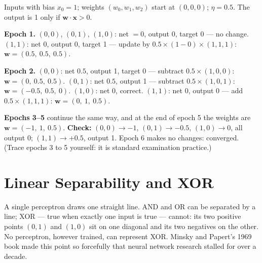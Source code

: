 \begin{worked}
Inputs with bias $x_0 = 1$; weights $(w_0, w_1, w_2)$ start at $(0, 0, 0)$; $\eta = 0.5$.
The output is 1 only if $\mathbf{w}\cdot\mathbf{x} > 0$.

\smallskip
\textbf{Epoch 1.} $(0,0)$, $(0,1)$, $(1,0)$: net $= 0$, output 0, target 0 --- no change.
$(1,1)$: net $0$, output 0, target 1 --- update by $0.5 \times (1 - 0) \times (1, 1, 1)$:
$\mathbf{w} = (0.5,\ 0.5,\ 0.5)$.

\textbf{Epoch 2.} $(0,0)$: net $0.5$, output 1, target 0 --- subtract $0.5 \times (1,0,0)$:
$\mathbf{w} = (0,\ 0.5,\ 0.5)$. $(0,1)$: net $0.5$, output 1 --- subtract
$0.5 \times (1,0,1)$: $\mathbf{w} = (-0.5,\ 0.5,\ 0)$. $(1,0)$: net $0$, correct.
$(1,1)$: net $0$, output 0 --- add $0.5 \times (1,1,1)$: $\mathbf{w} = (0,\ 1,\ 0.5)$.

\textbf{Epochs 3--5} continue the same way, and at the end of epoch 5 the weights are
$\mathbf{w} = (-1,\ 1,\ 0.5)$. \textbf{Check:} $(0,0) \to -1$, $(0,1) \to -0.5$,
$(1,0) \to 0$, all output 0; $(1,1) \to +0.5$, output 1. Epoch 6 makes no changes:
converged. (Trace epochs 3 to 5 yourself: it is standard examination practice.)
\end{worked}

\section{Linear Separability and XOR}

A single perceptron draws one straight line. AND and OR can be separated by a line;
XOR --- true when exactly one input is true --- cannot: its two positive points
$(0,1)$ and $(1,0)$ sit on one diagonal and its two negatives on the other. No
perceptron, however trained, can represent XOR. Minsky and Papert's 1969 book made
this point so forcefully that neural network research stalled for over a decade.

